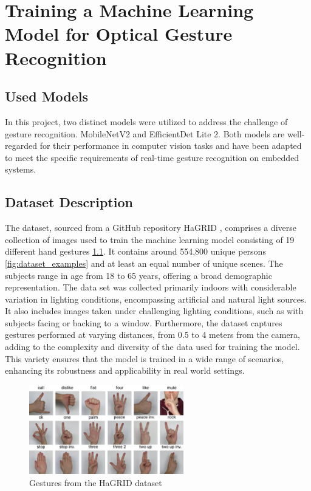 \chapter{Training a Machine Learning Model for Optical Gesture Recognition}

\section{Used Models}

In this project, two distinct models were utilized to address the challenge of gesture recognition. MobileNetV2 and EfficientDet Lite 2. Both models are well-regarded for their performance in computer vision tasks and have been adapted to meet the specific requirements of real-time gesture recognition on embedded systems.

\section{Dataset Description}
The dataset, sourced from a GitHub repository HaGRID \cite{hagrid}, comprises a diverse collection of images used to train the machine learning model consisting of 19 different hand gestures \ref{fig:dataset_gestures}. It contains around 554,800 unique persons \ref{fig:dataset_examples} and at least an equal number of unique scenes. The subjects range in age from 18 to 65 years, offering a broad demographic representation. The data set was collected primarily indoors with considerable variation in lighting conditions, encompassing artificial and natural light sources. It also includes images taken under challenging lighting conditions, such as with subjects facing or backing to a window. Furthermore, the dataset captures gestures performed at varying distances, from 0.5 to 4 meters from the camera, adding to the complexity and diversity of the data used for training the model. This variety ensures that the model is trained in a wide range of scenarios, enhancing its robustness and applicability in real world settings.
\newpage
\begin{figure}[h]
    \centering
    \includegraphics[width=0.6\textwidth]{obrazky-figures/gestures_jpg.jpg}
    \caption{Gestures from the HaGRID dataset}
    \label{fig:dataset_gestures}
\end{figure}

